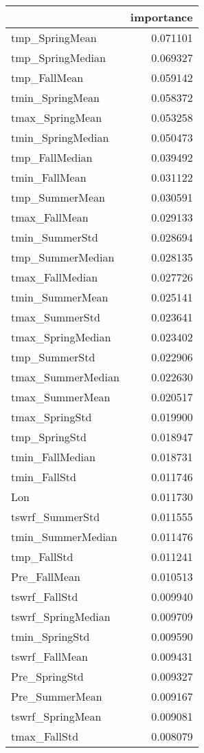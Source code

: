 \begin{tabular}{lr}
\toprule
 & importance \\
\midrule
tmp_SpringMean & 0.071101 \\
tmp_SpringMedian & 0.069327 \\
tmp_FallMean & 0.059142 \\
tmin_SpringMean & 0.058372 \\
tmax_SpringMean & 0.053258 \\
tmin_SpringMedian & 0.050473 \\
tmp_FallMedian & 0.039492 \\
tmin_FallMean & 0.031122 \\
tmp_SummerMean & 0.030591 \\
tmax_FallMean & 0.029133 \\
tmin_SummerStd & 0.028694 \\
tmp_SummerMedian & 0.028135 \\
tmax_FallMedian & 0.027726 \\
tmin_SummerMean & 0.025141 \\
tmax_SummerStd & 0.023641 \\
tmax_SpringMedian & 0.023402 \\
tmp_SummerStd & 0.022906 \\
tmax_SummerMedian & 0.022630 \\
tmax_SummerMean & 0.020517 \\
tmax_SpringStd & 0.019900 \\
tmp_SpringStd & 0.018947 \\
tmin_FallMedian & 0.018731 \\
tmin_FallStd & 0.011746 \\
Lon & 0.011730 \\
tswrf_SummerStd & 0.011555 \\
tmin_SummerMedian & 0.011476 \\
tmp_FallStd & 0.011241 \\
Pre_FallMean & 0.010513 \\
tswrf_FallStd & 0.009940 \\
tswrf_SpringMedian & 0.009709 \\
tmin_SpringStd & 0.009590 \\
tswrf_FallMean & 0.009431 \\
Pre_SpringStd & 0.009327 \\
Pre_SummerMean & 0.009167 \\
tswrf_SpringMean & 0.009081 \\
tmax_FallStd & 0.008079 \\

\end{tabular}

